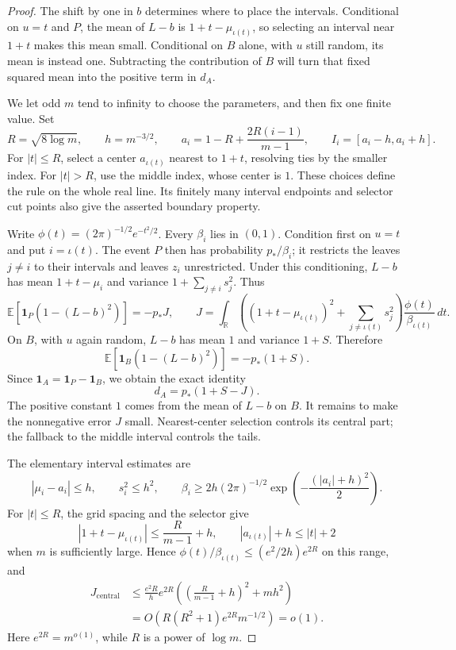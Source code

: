 \begin{proof}
The shift by one in $b$ determines where to place the intervals.
Conditional on $u=t$ and $P$, the mean of $L-b$ is
$1+t-\mu_{\iota(t)}$, so selecting an interval near $1+t$ makes
this mean small.  Conditional on $B$ alone, with $u$ still random,
its mean is instead one.  Subtracting the contribution of $B$ will
turn that fixed squared mean into the positive term in $d_A$.

We let odd $m$ tend to infinity to choose the parameters, and then fix
one finite value.  Set
\[
 R=\sqrt{8\log m},\qquad h=m^{-3/2},\qquad
 a_i=1-R+\frac{2R(i-1)}{m-1},\qquad I_i=[a_i-h,a_i+h].
\]
For $|t|\le R$, select a center $a_{\iota(t)}$ nearest to $1+t$,
resolving ties by the smaller index.  For $|t|>R$, use the middle
index, whose center is $1$.  These choices define the rule on the
whole real line.  Its finitely many interval endpoints and selector
cut points also give the asserted boundary property.

Write $\phi(t)=(2\pi)^{-1/2}e^{-t^2/2}$.  Every $\beta_i$ lies in
$(0,1)$.  Condition first on $u=t$ and put $i=\iota(t)$.  The event
$P$ then has probability $p_*/\beta_i$; it restricts the leaves
$j\ne i$ to their intervals and leaves $z_i$ unrestricted.  Under
this conditioning, $L-b$ has mean $1+t-\mu_i$ and variance
$1+\sum_{j\ne i}s_j^2$.  Thus
\[
 \mathbb E[\mathbf1_P(1-(L-b)^2)]=-p_*J,
 \qquad
 J=\int_{\mathbb R}
 \left((1+t-\mu_{\iota(t)})^2+
                   \sum_{j\ne\iota(t)}s_j^2\right)
                 \frac{\phi(t)}{\beta_{\iota(t)}}\,dt.
\]
On $B$, with $u$ again random, $L-b$ has mean $1$ and variance
$1+S$.  Therefore
\[
 \mathbb E[\mathbf1_B(1-(L-b)^2)]=-p_*(1+S).
\]
Since $\mathbf1_A=\mathbf1_P-\mathbf1_B$, we obtain the exact identity
\begin{equation}\label{eq:gaussian-identity}
 d_A=p_*(1+S-J).
\end{equation}
The positive constant $1$ comes from the mean of $L-b$ on $B$.
It remains to make the nonnegative error $J$ small.  Nearest-center
selection controls its central part; the fallback to the middle
interval controls the tails.

The elementary interval estimates are
\[
 |\mu_i-a_i|\le h,\qquad s_i^2\le h^2,\qquad
 \beta_i\ge 2h(2\pi)^{-1/2}
              \exp\!\left(-\frac{(|a_i|+h)^2}{2}\right).
\]
For $|t|\le R$, the grid spacing and the selector give
\[
 |1+t-\mu_{\iota(t)}|\le\frac{R}{m-1}+h,
 \qquad |a_{\iota(t)}|+h\le |t|+2
\]
when $m$ is sufficiently large.  Hence
$\phi(t)/\beta_{\iota(t)}\le(e^2/2h)e^{2R}$ on this range, and
\begin{align*}
 J_{\mathrm{central}}
 &\le\frac{e^2R}{h}e^{2R}
       \left(\left(\frac{R}{m-1}+h\right)^2+mh^2\right)\\
 &=O\!\left(R(R^2+1)e^{2R}m^{-1/2}\right)=o(1).
\end{align*}
Here $e^{2R}=m^{o(1)}$, while $R$ is a power of $\log m$.


\end{proof}
